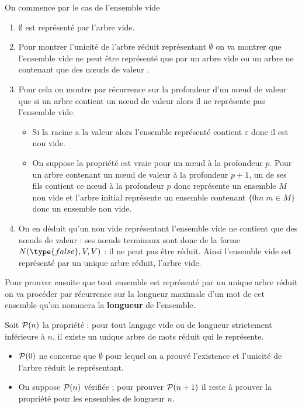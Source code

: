 \begin{Exercise}
On commence par le cas de l'ensemble vide 
\begin{enumerate}
    \item $\emptyset$ est représenté par l'arbre vide.
    \item Pour montrer l'unicité de l'arbre réduit représentant $\emptyset$ on va montrer que l'ensemble vide ne peut être représenté que par un arbre vide ou un arbre ne contenant que des nœuds de valeur .
    \item Pour cela on montre par récurrence sur la profondeur d'un nœud de valeur que si un arbre contient un nœud de valeur  alors il ne représente pas l'ensemble vide.
    \begin{itemize}
        \item Si la racine a la valeur  alors l'ensemble représenté contient $\varepsilon$ donc il est non vide.
        \item On suppose la propriété est vraie pour un nœud à la profondeur $p$. Pour un arbre contenant un nœud de valeur  à la profondeur $p+1$, un de ses fils contient ce nœud à la profondeur $p$ donc représente un ensemble $M$ non vide et l'arbre initial représente un ensemble contenant $\{0m\; m\in M\}$ donc un ensemble non vide.
    \end{itemize}
    \item On en déduit qu'un non vide représentant l'ensemble vide ne contient que des nœuds de valeur  : ses nœuds terminaux sont donc de la forme $N(\type{false}, V, V)$ : il ne peut pas être réduit.
Ainsi l'ensemble vide est représenté par un unique arbre réduit, l'arbre vide.
\end{enumerate}
\medskip

Pour prouver ensuite que tout ensemble est représenté par un unique arbre réduit on va procéder par récurrence sur la longueur maximale d'un mot de cet ensemble qu'on nommera la {\bf longueur} de l'ensemble.

Soit ${\cal P}(n)$ la propriété : pour tout langage vide ou de longueur strictement inférieure à $n$, il existe un unique arbre de mots réduit qui le représente.
\begin{itemize}
    \item ${\cal P}(0)$ ne concerne que $\emptyset$ pour lequel on a prouvé l'existence et l'unicité de l'arbre réduit le représentant.
    \item On suppose ${\cal P}(n)$ vérifiée ; pour prouver ${\cal P}(n+1)$ il reste à prouver la propriété pour les ensembles de longueur $n$.
    

\end{itemize}
\end{Exercise}
